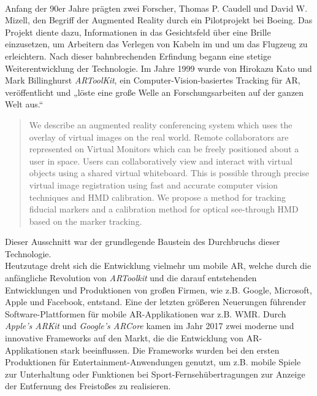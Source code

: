 \\ 
Anfang der 90er Jahre prägten zwei Forscher, Thomas P. Caudell und David W. Mizell, den Begriff der Augmented Reality durch ein Pilotprojekt
bei Boeing. Das Projekt diente dazu, Informationen in das Gesichtsfeld über eine Brille einzusetzen, um Arbeitern das Verlegen von Kabeln im und um das 
Flugzeug zu erleichtern. Nach dieser bahnbrechenden Erfindung begann eine stetige Weiterentwicklung der Technologie. Im Jahre 1999 wurde 
von Hirokazu Kato und Mark Billinghurst \textit{ARToolKit}, ein Computer-Vision-basiertes Tracking für AR, veröffentlicht und „löste eine 
große Welle an Forschungsarbeiten auf der ganzen Welt aus.“ \cite{springer.2019s} 
\begin{quote}
    We describe an augmented reality conferencing system which uses the overlay of virtual images on the real world. Remote collaborators 
    are represented on Virtual Monitors which can be freely positioned about a user in space. Users can collaboratively view and interact 
    with virtual objects using a shared virtual whiteboard. This is possible through precise virtual image registration using fast and 
    accurate computer vision techniques and HMD calibration. We propose a method for tracking fiducial markers and a calibration method 
    for optical see-through HMD based on the marker tracking. \cite{artoolkitsheet.1999o}
\end{quote}
Dieser Ausschnitt war der grundlegende Baustein des Durchbruchs dieser Technologie.%
\\ 
Heutzutage dreht sich die Entwicklung vielmehr um mobile AR, welche durch die anfängliche Revolution von \textit{ARToolkit} und die darauf 
entstehenden Entwicklungen und Produktionen von großen Firmen, wie z.B. Google, Microsoft, Apple und Facebook, entstand. Eine der letzten 
größeren Neuerungen führender Software-Plattformen für mobile AR-Applikationen war z.B. \acl{WMR}. Durch 
\textit{Apple's ARKit} und \textit{Google's ARCore} kamen im Jahr 2017 zwei moderne und innovative Frameworks auf den Markt, die die 
Entwicklung von \acl{AR}-Applikationen stark beeinflussen. Die Frameworks wurden bei den ersten Produktionen für Entertainment-Anwendungen 
genutzt, um z.B. mobile Spiele zur Unterhaltung oder Funktionen bei Sport-Fernsehübertragungen zur Anzeige der Entfernung des Freistoßes zu 
realisieren.
\\ 
\linebreak
